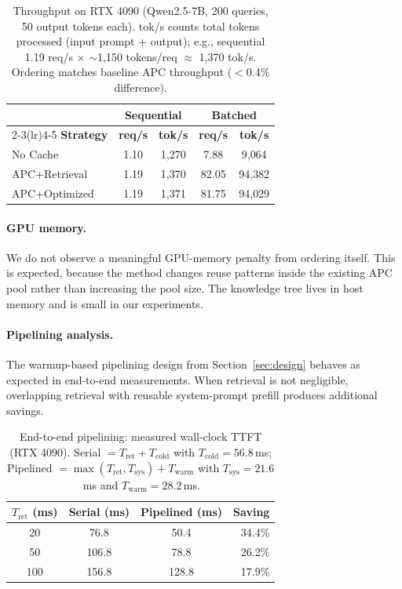 \documentclass{article}
\begin{document}
\begin{table}[t]
\caption{Throughput on RTX 4090 (Qwen2.5-7B, 200 queries, 50 output tokens each). tok/s counts total tokens processed (input prompt + output); e.g., sequential 1.19 req/s $\times$ ${\sim}$1{,}150 tokens/req $\approx$ 1{,}370 tok/s. Ordering matches baseline APC throughput ($<$0.4\% difference).}
\label{tab:throughput}
\centering
\small
\begin{tabular}{@{}lcccc@{}}
\toprule
 & \multicolumn{2}{c}{\textbf{Sequential}} & \multicolumn{2}{c}{\textbf{Batched}} \\
\cmidrule(lr){2-3}\cmidrule(lr){4-5}
\textbf{Strategy} & \textbf{req/s} & \textbf{tok/s} & \textbf{req/s} & \textbf{tok/s} \\
\midrule
No Cache      & 1.10 & 1{,}270 & 7.88 & 9{,}064 \\
APC+Retrieval & 1.19 & 1{,}370 & 82.05 & 94{,}382 \\
APC+Optimized & 1.19 & 1{,}371 & 81.75 & 94{,}029 \\
\bottomrule
\end{tabular}
\vspace{-0.5em}
\end{table}

\paragraph{GPU memory.} We do not observe a meaningful GPU-memory penalty from ordering itself. This is expected, because the method changes reuse patterns inside the existing APC pool rather than increasing the pool size. The knowledge tree lives in host memory and is small in our experiments.

\paragraph{Pipelining analysis.}
The warmup-based pipelining design from Section~\ref{sec:design} behaves as expected in end-to-end measurements. When retrieval is not negligible, overlapping retrieval with reusable system-prompt prefill produces additional savings.

\begin{table}[t]
\caption{End-to-end pipelining: measured wall-clock TTFT (RTX 4090). Serial $=T_{\text{ret}}+T_{\text{cold}}$ with $T_{\text{cold}}=56.8$\,ms; Pipelined $=\max(T_{\text{ret}},T_{\text{sys}})+T_{\text{warm}}$ with $T_{\text{sys}}=21.6$\,ms and $T_{\text{warm}}=28.2$\,ms.}
\label{tab:pipelining_e2e}
\centering
\small
\begin{tabular}{@{}cccr@{}}
\toprule
\textbf{$T_{\text{ret}}$ (ms)} & \textbf{Serial (ms)} & \textbf{Pipelined (ms)} & \textbf{Saving} \\
\midrule
20  & 76.8  & 50.4  & 34.4\% \\
50  & 106.8 & 78.8  & 26.2\% \\
100 & 156.8 & 128.8 & 17.9\% \\
\bottomrule
\end{tabular}
\vspace{-0.5em}
\end{table}
\end{document}
